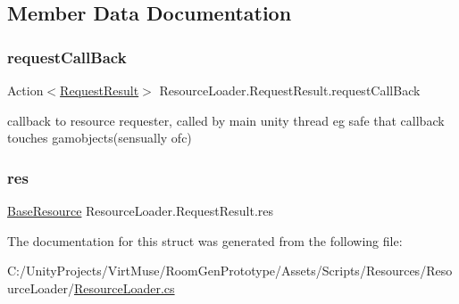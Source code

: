 \subsection{Member Data Documentation}
\mbox{\label{struct_resource_loader_1_1_request_result_a5fc428ab3bd32cff753734f7c9f55620}} 
\subsubsection{\texorpdfstring{request\+Call\+Back}{requestCallBack}}
{\footnotesize\ttfamily Action$<$\mbox{\hyperlink{struct_resource_loader_1_1_request_result}{Request\+Result}}$>$ Resource\+Loader.\+Request\+Result.\+request\+Call\+Back}



callback to resource requester, called by main unity thread eg safe that callback touches gamobjects(sensually ofc) 

\mbox{\label{struct_resource_loader_1_1_request_result_acf9eab09a9d18dad45a9990026bfaea1}} 
\subsubsection{\texorpdfstring{res}{res}}
{\footnotesize\ttfamily \mbox{\hyperlink{class_base_resource}{Base\+Resource}} Resource\+Loader.\+Request\+Result.\+res}



The documentation for this struct was generated from the following file\+:\begin{DoxyCompactItemize}
\item 
C\+:/\+Unity\+Projects/\+Virt\+Muse/\+Room\+Gen\+Prototype/\+Assets/\+Scripts/\+Resources/\+Resource\+Loader/\mbox{\hyperlink{_resource_loader_8cs}{Resource\+Loader.\+cs}}\end{DoxyCompactItemize}
